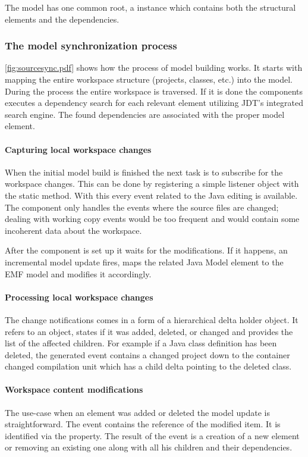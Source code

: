 The model has one common root, a  instance which contains both
the structural elements and the dependencies.

\subsubsection{The model synchronization process}
\autoref{fig:sourcesync.pdf} shows how the process  of model building works. It
starts with mapping the entire workspace structure (projects, classes, etc.)
into the model. During the process the entire workspace is traversed. If it is 
done the components executes a dependency search for each relevant element 
utilizing JDT's integrated search engine. The found dependencies are associated 
with the proper model element.

\paragraph{Capturing local workspace changes}
When the initial model build is finished the next task is to subscribe for the
workspace changes. This can be done by registering a simple listener object with
the   static
method. With this every event related to the Java editing is available. The
component only handles the events where the source files are changed; dealing
with working copy events would be too frequent and would contain some incoherent
data about the workspace. 
	
After the component is set up it waits for the modifications. If it happens, an
incremental model update fires, maps the related Java Model element to the EMF
model and modifies it accordingly. 

\paragraph{Processing local workspace changes}
The change notifications comes in a form of a hierarchical delta holder object.
It refers to an object, states if it was added, deleted, or changed and provides
the list of the affected children. For example if a Java class definition has
been deleted, the generated event contains a changed project down to the
container changed compilation unit which has a child delta pointing to the
deleted class.

\paragraph{Workspace content modifications}
The use-case when an element was added or deleted the model update is
straightforward. The event contains the reference of the modified item. It is
identified via the  property. The result of the event is a
creation of a new element or removing an existing one along with all his
children and their dependencies.

